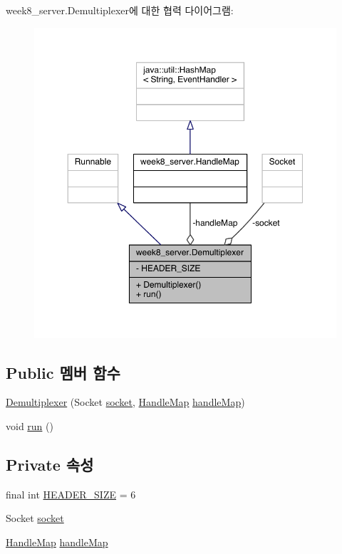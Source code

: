week8\-\_\-server.\-Demultiplexer에 대한 협력 다이어그램\-:
\nopagebreak
\begin{figure}[H]
\begin{center}
\leavevmode
\includegraphics[width=350pt]{classweek8__server_1_1_demultiplexer__coll__graph}
\end{center}
\end{figure}
\subsection*{Public 멤버 함수}
\begin{DoxyCompactItemize}
\item 
\hyperlink{classweek8__server_1_1_demultiplexer_ad036466accbe99d2e8d1c09a50ecf70f}{Demultiplexer} (Socket \hyperlink{classweek8__server_1_1_demultiplexer_aa59bc55dc4eed3ea0247a8ea46913262}{socket}, \hyperlink{classweek8__server_1_1_handle_map}{Handle\-Map} \hyperlink{classweek8__server_1_1_demultiplexer_a9de8a7b062866296383729ba6e4ce0a1}{handle\-Map})
\item 
void \hyperlink{classweek8__server_1_1_demultiplexer_a5a09b3bc531ceb71fe22f1cadf3559c8}{run} ()
\end{DoxyCompactItemize}
\subsection*{Private 속성}
\begin{DoxyCompactItemize}
\item 
final int \hyperlink{classweek8__server_1_1_demultiplexer_a5240d883d891045d3cdf5f5497637eb1}{H\-E\-A\-D\-E\-R\-\_\-\-S\-I\-Z\-E} = 6
\item 
Socket \hyperlink{classweek8__server_1_1_demultiplexer_aa59bc55dc4eed3ea0247a8ea46913262}{socket}
\item 
\hyperlink{classweek8__server_1_1_handle_map}{Handle\-Map} \hyperlink{classweek8__server_1_1_demultiplexer_a9de8a7b062866296383729ba6e4ce0a1}{handle\-Map}
\end{DoxyCompactItemize}


